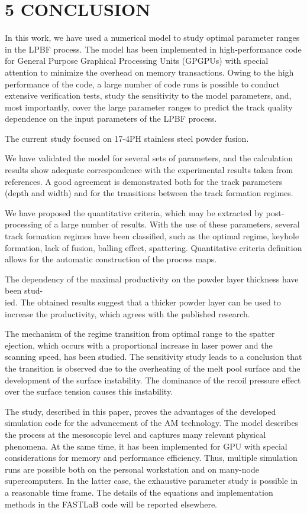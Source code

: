 \documentclass[10pt]{article}
\begin{document}
\section*{5 CONCLUSION}
In this work, we have used a numerical model to study optimal parameter ranges in the LPBF process. The model has been implemented in high-performance code for General Purpose Graphical Processing Units (GPGPUs) with special attention to minimize the overhead on memory transactions. Owing to the high performance of the code, a large number of code runs is possible to conduct extensive verification tests, study the sensitivity to the model parameters, and, most importantly, cover the large parameter ranges to predict the track quality dependence on the input parameters of the LPBF process.

The current study focused on 17-4PH stainless steel powder fusion.

We have validated the model for several sets of parameters, and the calculation results show adequate correspondence with the experimental results taken from references. A good agreement is demonstrated both for the track parameters (depth and width) and for the transitions between the track formation regimes.

We have proposed the quantitative criteria, which may be extracted by post-processing of a large number of results. With the use of these parameters, several track formation regimes have been classified, such as the optimal regime, keyhole formation, lack of fusion, balling effect, spattering. Quantitative criteria definition allows for the automatic construction of the process maps.

The dependency of the maximal productivity on the powder layer thickness have been stud-\\
ied. The obtained results suggest that a thicker powder layer can be used to increase the productivity, which agrees with the published research.

The mechanism of the regime transition from optimal range to the spatter ejection, which occurs with a proportional increase in laser power and the scanning speed, has been studied. The sensitivity study leads to a conclusion that the transition is observed due to the overheating of the melt pool surface and the development of the surface instability. The dominance of the recoil pressure effect over the surface tension causes this instability.

The study, described in this paper, proves the advantages of the developed simulation code for the advancement of the AM technology. The model describes the process at the mesoscopic level and captures many relevant physical phenomena. At the same time, it has been implemented for GPU with special considerations for memory and performance efficiency. Thus, multiple simulation runs are possible both on the personal workstation and on many-node supercomputers. In the latter case, the exhaustive parameter study is possible in a reasonable time frame. The details of the equations and implementation methods in the FASTLaB code will be reported elsewhere.
\end{document}
